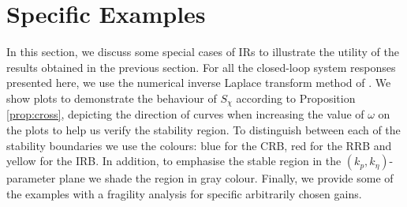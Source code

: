 \documentclass[twoside,reqno,11pt]{fcaa-var} %
\begin{document}
\section{Specific Examples}
In this section, we discuss some special cases of IRs to illustrate the utility of the results obtained in the previous section. For all the closed-loop system responses presented here, we use the numerical inverse Laplace transform method of \cite{Abate2006}. We show plots to demonstrate the behaviour of $S_\chi$ according to Proposition \ref{prop:cross}, depicting the direction of curves when increasing the value of $\omega$ on the plots to help us verify the stability region. To distinguish between each of the stability boundaries we use the colours: blue for the CRB, red for the RRB and yellow for the IRB. In addition, to emphasise the stable region in the $(k_p,k_\eta)$-parameter plane we shade the region in gray colour. Finally, we provide some of the examples with a fragility analysis for specific arbitrarily chosen gains. 
\end{document}
